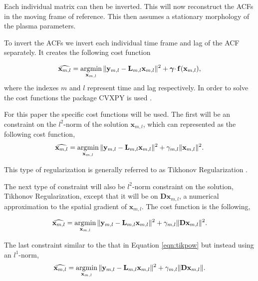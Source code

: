 \noindent Each individual matrix can then be inverted. This will now reconstruct the ACFs in the moving frame of reference. This then assumes a stationary morphology of the plasma parameters. 

To invert the ACFs we invert each individual time frame and lag of the ACF separately. It creates the following cost function

\begin{equation}
\label{eqn:lstsqrsvecdblag}
\widehat{\mathbf{x}_{m,l}} = \operatorname*{\arg\!\min}\limits_{\mathbf{x}_{m,l}} \|\mathbf{y}_{m,l} -\mathbf{L}_{m,l}\mathbf{x}_{m,l} \|^2 + \boldsymbol{\gamma}\cdotp\mathbf{f}(\mathbf{x}_{m,l}),
\end{equation}
\noindent where the indexes $m$ and $l$ represent time and lag respectively. In order to solve the cost functions the package CVXPY is used \citep{cvxpy}.

For this paper the specific cost functions will be used. The first will be an constraint on the $l^2$-norm of the solution $\mathbf{x}_{m,l}$, which can represented as the following cost function,
\begin{equation}
\label{eqn:tikpow}
\widehat{\mathbf{x}_{m,l}} = \operatorname*{\arg\!\min}\limits_{\mathbf{x}_{m,l}} \|\mathbf{y}_{m,l} -\mathbf{L}_{m,l}\mathbf{x}_{m,l} \|^2 +\gamma_{m,l} \|\mathbf{x}_{m,l}\|^2.
\end{equation}

\noindent This type of regularization is generally referred to as Tikhonov Regularization \citep{Karl:2005jy}.

The next type of constraint will also be $l^2$-norm constraint on the solution, Tikhonov Regularization, except that it will be on $\mathbf{D}\mathbf{x}_{m,l}$, a numerical approximation to the spatial gradient of $\mathbf{x}_{m,l}$. The cost function is the following,

\begin{equation}
\label{eqn:tikD}
\widehat{\mathbf{x}_{m,l}} = \operatorname*{\arg\!\min}\limits_{\mathbf{x}_{m,l}} \|\mathbf{y}_{m,l} -\mathbf{L}_{m,l}\mathbf{x}_{m,l} \|^2 + \gamma_{m,l} \|\mathbf{D}\mathbf{x}_{m,l}\|^2.
\end{equation}

\noindent The last constraint similar to the that in Equation \ref{eqn:tikpow} but instead using an $l^1$-norm,
\begin{equation}
\label{eqn:tv}
\widehat{\mathbf{x}_{m,l}} = \operatorname*{\arg\!\min}\limits_{\mathbf{x}_{m,l}} \|\mathbf{y}_{m,l} -\mathbf{L}_{m,l}\mathbf{x}_{m,l} \|^2 + \gamma_{m,l} \|\mathbf{D}\mathbf{x}_{m,l}\|.
\end{equation} 

